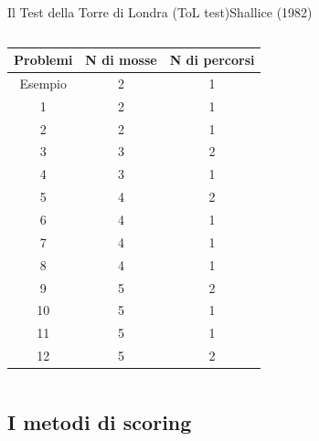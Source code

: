 \documentclass{beamer}
\begin{document}
\begin{frame}{Il Test della Torre di Londra (ToL test)}{Shallice (1982)}
\begin{columns}
\begin{center}
			\vspace{ .2cm}
			\begin{tabular}{ccc}
				\hline
				Problemi	&	N di mosse	&	N di percorsi	\\
				\hline
				Esempio	&	2	&	1	\\
				1	&	2	&	1	\\
				2	&	2	&	1	\\
				3	&	3	&	2	\\
				4	&	3	&	1	\\
				5	&	4	&	2	\\
				6	&	4	&	1	\\
				7	&	4	&	1	\\
				8	&	4	&	1	\\
				9	&	5	&	2	\\
				10	&	5	&	1	\\
				11	&	5	&	1	\\
				12	&	5	&	2	\\
				\hline
			\end{tabular}
		\end{center}
	\end{columns}
\end{frame}

\subsection{I metodi di scoring}
\end{document}

